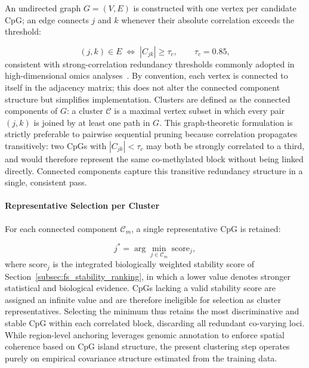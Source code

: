 An undirected graph $G = (V, E)$ is constructed with one 
vertex per candidate CpG; an edge connects $j$ and $k$ 
whenever their absolute correlation exceeds the threshold:

\begin{equation}
(j,k) \in E
\;\Longleftrightarrow\;
|C_{jk}| \geq \tau_c,
\qquad
\tau_c = 0.85,
\label{eq:corr_graph}
\end{equation}
consistent with strong-correlation redundancy thresholds 
commonly adopted in high-dimensional omics 
analyses~\cite{Witten2010, Friedman2010}. By convention, each vertex is connected to itself in the adjacency matrix; 
this does not alter the connected component structure but simplifies 
implementation. Clusters are 
defined as the connected components of $G$: a cluster 
$\mathcal{C}$ is a maximal vertex subset in which every 
pair $(j,k)$ is joined by at least one path in $G$.
This graph-theoretic formulation is strictly preferable 
to pairwise sequential pruning because correlation 
propagates transitively: two CpGs with $|C_{jk}| < \tau_c$ 
may both be strongly correlated to a third, and would 
therefore represent the same co-methylated block without 
being linked directly. Connected components capture this 
transitive redundancy structure in a single, consistent pass.

\paragraph{Representative Selection per Cluster}

For each connected component $\mathcal{C}_m$, a single 
representative CpG is retained:

\begin{equation}
j^*
=
\arg\min_{j \in \mathcal{C}_m}
\,\mathrm{score}_j,
\label{eq:cluster_rep}
\end{equation}
where $\mathrm{score}_j$ is the integrated biologically 
weighted stability score of 
Section~\ref{subsec:fs_stability_ranking}, in which a 
lower value denotes stronger statistical and biological 
evidence. CpGs lacking a valid stability score are assigned an infinite value and are 
therefore ineligible for selection as cluster representatives. Selecting the minimum thus retains the most 
discriminative and stable CpG within each correlated 
block, discarding all redundant co-varying loci. While region-level anchoring leverages genomic annotation to enforce spatial 
coherence based on CpG island structure, the present clustering step operates 
purely on empirical covariance structure estimated from the training data.

